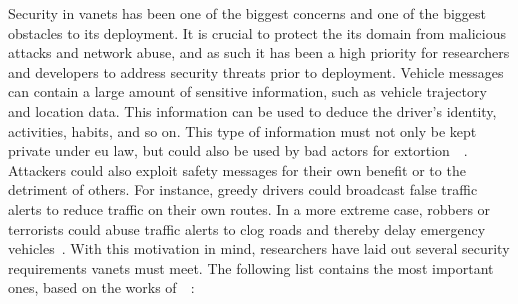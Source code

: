 Security in \glspl{vanet} has been one of the biggest concerns and one of the biggest obstacles to its deployment. It is crucial to protect the \gls{its} domain from malicious attacks and network abuse, and as such it has been a high priority for researchers and developers to address security threats prior to deployment.
Vehicle messages can contain a large amount of sensitive information, such as vehicle trajectory and location data. This information can be used to deduce the driver's identity, activities, habits, and so on. This type of information must not only be kept private under \gls{eu} law, but could also be used by bad actors for extortion~\cite{liang_vehicular_2015}~\cite{malhi_security_2020}.
Attackers could also exploit safety messages for their own benefit or to the detriment of others. For instance, greedy drivers could broadcast false traffic alerts to reduce traffic on their own routes. In a more extreme case, robbers or terrorists could abuse traffic alerts to clog roads and thereby delay emergency vehicles~\cite{malhi_security_2020}. 
With this motivation in mind, researchers have laid out several security requirements \glspl{vanet} must meet. The following list contains the most important ones, based on the works of~\cite{hasrouny_vanet_2017}~\cite{malhi_security_2020}:

